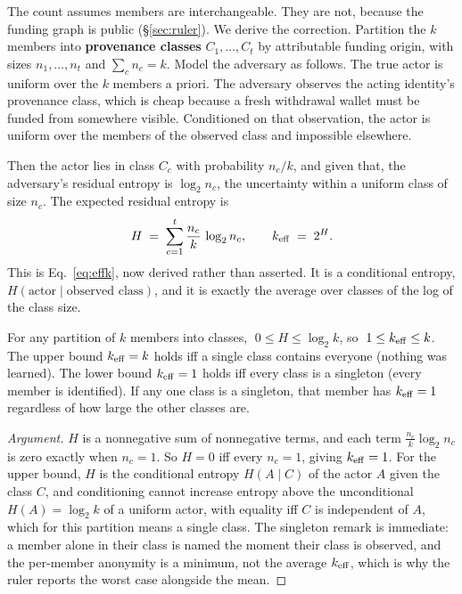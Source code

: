 \documentclass[11pt]{article}
\begin{document}
The count assumes members are interchangeable. They are not, because the funding graph is
public (\S\ref{sec:ruler}). We derive the correction. Partition the $k$ members into
\textbf{provenance classes} $C_1, \dots, C_t$ by attributable funding origin, with sizes
$n_1, \dots, n_t$ and $\sum_c n_c = k$. Model the adversary as follows. The true actor is
uniform over the $k$ members a priori. The adversary observes the acting identity's
provenance class, which is cheap because a fresh withdrawal wallet must be funded from
somewhere visible. Conditioned on that observation, the actor is uniform over the
members of the observed class and impossible elsewhere.

Then the actor lies in class $C_c$ with probability $n_c / k$, and given that, the
adversary's residual entropy is $\log_2 n_c$, the uncertainty within a uniform class of
size $n_c$. The expected residual entropy is
\begin{equation}
H \;=\; \sum_{c=1}^{t} \frac{n_c}{k}\,\log_2 n_c, \qquad k_{\mathrm{eff}} \;=\; 2^{H}.
\label{eq:effk-derived}
\end{equation}
This is Eq.~\ref{eq:effk}, now derived rather than asserted. It is a conditional entropy,
$H(\text{actor} \mid \text{observed class})$, and it is exactly the average over classes
of the log of the class size.

\begin{claimx}
For any partition of $k$ members into classes, $\;0 \le H \le \log_2 k$, so
$\;1 \le k_{\mathrm{eff}} \le k$. The upper bound $k_{\mathrm{eff}} = k$ holds iff a single class contains
everyone (nothing was learned). The lower bound $k_{\mathrm{eff}} = 1$ holds iff every class is a
singleton (every member is identified). If any one class is a singleton, that member has
$k_{\mathrm{eff}} = 1$ regardless of how large the other classes are.
\end{claimx}

\begin{proof}[Argument]
$H$ is a nonnegative sum of nonnegative terms, and each term $\tfrac{n_c}{k}\log_2 n_c$
is zero exactly when $n_c = 1$. So $H = 0$ iff every $n_c = 1$, giving $k_{\mathrm{eff}} = 1$. For
the upper bound, $H$ is the conditional entropy $H(A \mid C)$ of the actor $A$ given the
class $C$, and conditioning cannot increase entropy above the unconditional
$H(A) = \log_2 k$ of a uniform actor, with equality iff $C$ is independent of $A$, which
for this partition means a single class. The singleton remark is immediate: a member
alone in their class is named the moment their class is observed, and the per-member
anonymity is a minimum, not the average $k_{\mathrm{eff}}$, which is why the ruler reports the worst
case alongside the mean.
\end{proof}
\end{document}

